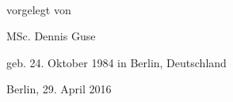 \begin{titlepage}
    \begin{addmargin}[-1cm]{-3cm}
    \begin{center}
        \large  

        \hfill

        \vfill

        \begingroup
            \color{Maroon}\spacedallcaps{\myTitle} \\ \bigskip
        \endgroup

				\vspace{0.7cm}	
				vorgelegt von
				
				\vspace{0.7cm}	
				MSc. Dennis Guse
				
				geb. 24. Oktober 1984 in Berlin, Deutschland



%				
%				
%
%				
%
%				
%			



				\vspace{1cm}
				Berlin, 29. April 2016
%
%
%

        \vfill                      

    \end{center}  
  \end{addmargin}       
\end{titlepage}   